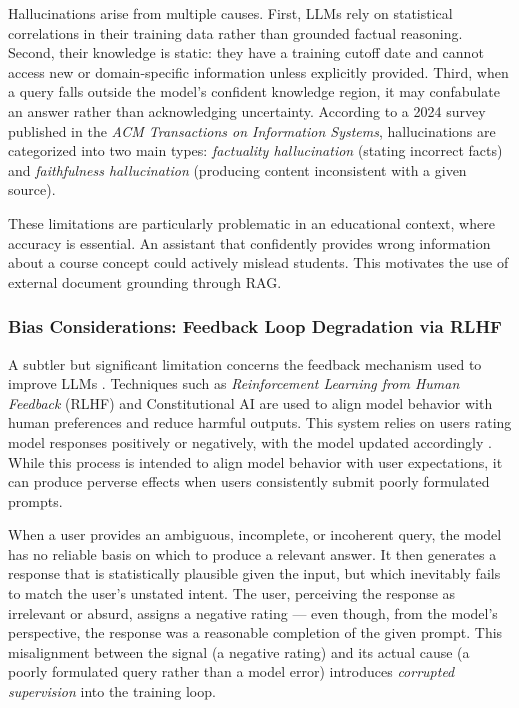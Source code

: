 \documentclass[a4paper,11pt]{article}
\begin{document}
Hallucinations arise from multiple causes. First, LLMs rely on statistical
correlations in their training data rather than grounded factual reasoning.
Second, their knowledge is static: they have a training cutoff date and
cannot access new or domain-specific information unless explicitly provided.
Third, when a query falls outside the model's confident knowledge region, it
may confabulate an answer rather than acknowledging uncertainty. According to
a 2024 survey published in the \emph{ACM Transactions on Information
Systems}, hallucinations are categorized into two main types:
\emph{factuality hallucination} (stating incorrect facts) and
\emph{faithfulness hallucination} (producing content inconsistent with a
given source).

These limitations are particularly problematic in an educational context,
where accuracy is essential. An assistant that confidently provides wrong
information about a course concept could actively mislead students. This
motivates the use of external document grounding through RAG.

\subsubsection{Bias Considerations: Feedback Loop Degradation via RLHF}

A subtler but significant limitation concerns the feedback mechanism used to
improve LLMs \cite{rlhf_challenges_medium}. Techniques such as
\emph{Reinforcement Learning from Human Feedback} (RLHF) and Constitutional
AI are used to align model behavior with human preferences and reduce harmful
outputs. This system relies on users rating model responses positively or
negatively, with the model updated accordingly \cite{ouyang2022rlhf}. While
this process is intended to align model behavior with user expectations, it
can produce perverse effects when users consistently submit poorly formulated
prompts.

When a user provides an ambiguous, incomplete, or incoherent query, the model
has no reliable basis on which to produce a relevant answer. It then generates
a response that is statistically plausible given the input, but which
inevitably fails to match the user's unstated intent. The user, perceiving
the response as irrelevant or absurd, assigns a negative rating --- even
though, from the model's perspective, the response was a reasonable
completion of the given prompt. This misalignment between the signal (a
negative rating) and its actual cause (a poorly formulated query rather than
a model error) introduces \emph{corrupted supervision} into the training
loop.
\end{document}
